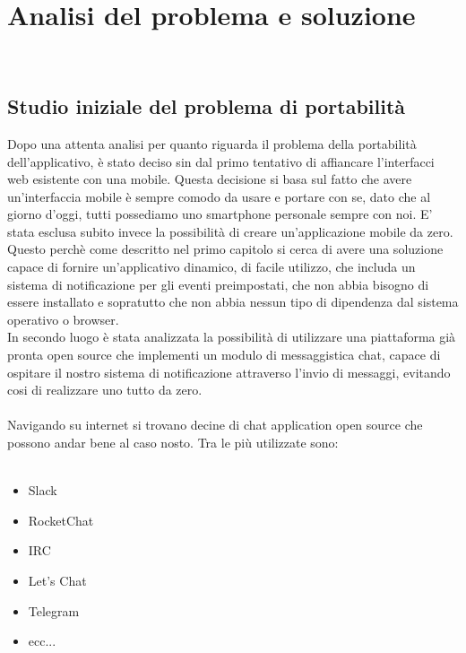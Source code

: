 
\chapter{Analisi del problema e soluzione}
\label{cap:analisi-problema}

\\


\section{Studio iniziale del problema di portabilità}
Dopo una attenta analisi per quanto riguarda il problema della portabilità dell'applicativo, è stato deciso sin dal primo tentativo di affiancare l'interfacci web esistente con una mobile. Questa decisione si basa sul fatto che avere un'interfaccia mobile è sempre comodo da usare e portare con se, dato che al giorno d'oggi, tutti possediamo uno smartphone personale sempre con noi. E' stata esclusa subito invece la possibilità di creare un'applicazione mobile da zero. Questo perchè come descritto nel primo capitolo si cerca di avere una soluzione capace di fornire un'applicativo dinamico, di facile utilizzo, che includa un sistema di notificazione per gli eventi preimpostati, che non abbia bisogno di essere installato e sopratutto che non abbia nessun tipo di dipendenza dal sistema operativo o browser.\\ 
 In secondo luogo è stata analizzata la possibilità di utilizzare una piattaforma già pronta open source che implementi un modulo di messaggistica chat, capace di ospitare il nostro sistema di notificazione attraverso l'invio di messaggi, evitando cosi di realizzare uno tutto da zero.\\\\
Navigando su internet si trovano decine di chat application open source che possono andar bene al caso nosto. Tra le più utilizzate sono: \\\\

\begin{itemize}
\item Slack 
\item RocketChat
\item IRC
\item Let's Chat
\item Telegram 
\item ecc...
\end{itemize}


